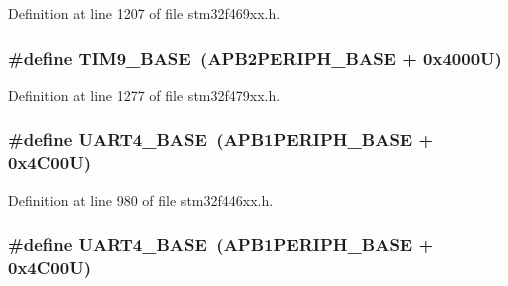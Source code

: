 Definition at line 1207 of file stm32f469xx.\+h.

\subsubsection[{\texorpdfstring{T\+I\+M9\+\_\+\+B\+A\+SE}{TIM9_BASE}}]{\setlength{\rightskip}{0pt plus 5cm}\#define T\+I\+M9\+\_\+\+B\+A\+SE~({\bf A\+P\+B2\+P\+E\+R\+I\+P\+H\+\_\+\+B\+A\+SE} + 0x4000\+U)}\hypertarget{group___peripheral__memory__map_ga92ae902be7902560939223dd765ece08}{}\label{group___peripheral__memory__map_ga92ae902be7902560939223dd765ece08}


Definition at line 1277 of file stm32f479xx.\+h.

\subsubsection[{\texorpdfstring{U\+A\+R\+T4\+\_\+\+B\+A\+SE}{UART4_BASE}}]{\setlength{\rightskip}{0pt plus 5cm}\#define U\+A\+R\+T4\+\_\+\+B\+A\+SE~({\bf A\+P\+B1\+P\+E\+R\+I\+P\+H\+\_\+\+B\+A\+SE} + 0x4\+C00\+U)}\hypertarget{group___peripheral__memory__map_ga94d92270bf587ccdc3a37a5bb5d20467}{}\label{group___peripheral__memory__map_ga94d92270bf587ccdc3a37a5bb5d20467}


Definition at line 980 of file stm32f446xx.\+h.

\subsubsection[{\texorpdfstring{U\+A\+R\+T4\+\_\+\+B\+A\+SE}{UART4_BASE}}]{\setlength{\rightskip}{0pt plus 5cm}\#define U\+A\+R\+T4\+\_\+\+B\+A\+SE~({\bf A\+P\+B1\+P\+E\+R\+I\+P\+H\+\_\+\+B\+A\+SE} + 0x4\+C00\+U)}\hypertarget{group___peripheral__memory__map_ga94d92270bf587ccdc3a37a5bb5d20467}{}\label{group___peripheral__memory__map_ga94d92270bf587ccdc3a37a5bb5d20467}


